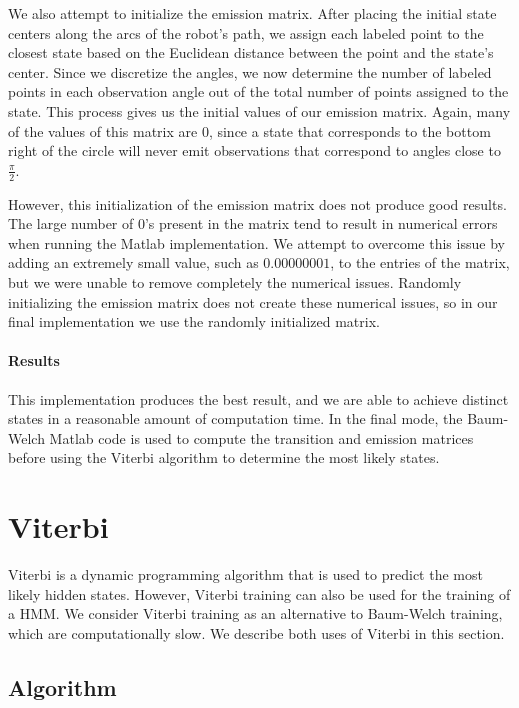 \documentclass[twoside]{article}
\begin{document}
We also attempt to initialize the emission matrix.
After placing the initial state centers along the arcs of the robot's path, we assign each labeled point to the closest state based on the Euclidean distance between the point and the state's center.
Since we discretize the angles, we now determine the number of labeled points in each observation angle out of the total number of points assigned to the state.
This process gives us the initial values of our emission matrix.
Again, many of the values of this matrix are $0$, since a state that corresponds to the bottom right of the circle will never emit observations that correspond to angles close to~$\frac{\pi}{2}$.

However, this initialization of the emission matrix does not produce good results.
The large number of $0$'s present in the matrix tend to result in numerical errors when running the Matlab implementation.
We attempt to overcome this issue by adding an extremely small value, such as $0.00000001$, to the entries of the matrix, but we were unable to remove completely the numerical issues.
Randomly initializing the emission matrix does not create these numerical issues, so in our final implementation we use the randomly initialized matrix.

\paragraph{Results}

This implementation produces the best result, and we are able to achieve distinct states in a reasonable amount of computation time.
In the final mode, the Baum-Welch Matlab code is used to compute the transition and emission matrices before using the Viterbi algorithm to determine the most likely states.

\section{Viterbi}\label{sec:viterbi}

Viterbi is a dynamic programming algorithm that is used to predict the most likely hidden states.
However, Viterbi training can also be used for the training of a HMM.
We consider Viterbi training as an alternative to Baum-Welch training, which are computationally slow.
We describe both uses of Viterbi in this section.

\subsection{Algorithm}\label{sec:algorithm-viterbi}
\end{document}
